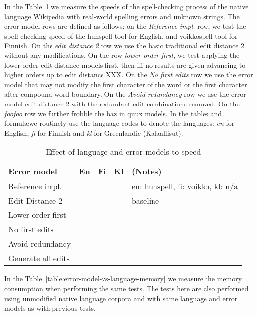 \documentclass[11pt]{article}
\begin{document}
In the Table~\ref{table:error-model-vs-language-speed} we measure the speeds of
the spell-checking process of the native language Wikipedia with real-world
spelling errors and unknown strings. The error model rows are defined as
follows: on the \emph{Reference impl.} row, we test the spell-checking speed of
the hunspell tool for English, and voikkospell tool for Finnish. On the
\emph{edit distance 2} row we use the basic traditional edit distance 2 without
any modifications. On the row \emph{lower order first}, we test applying the
lower order edit distance models first, then iff no results are given advancing
to higher orders up to edit distance XXX. On the \emph{No first edits} row we
use the error model that may not modify the first character of the word or the
first character after compound word boundary. On the \emph{Avoid redundancy}
row we use the error model edit distance 2 with the redundant edit combinations
removed. On the \emph{foofoo} row we further frobble the baz  in quux models.
In the tables and formul\ae we routinely use the language codes to denote the
languages: \emph{en} for English, \emph{fi} for Finnish and \emph{kl} for 
Greenlandic (Kalaallisut). 

\begin{table}[h]
\begin{center}
\begin{scriptsize}
\begin{tabular}{|l|rrrl|}
\hline
\bf Error model & \bf En & \bf Fi & \bf Kl & (Notes) \\ 
\hline
Reference impl.   & & & --- & en: hunspell, fi: voikko, kl: n/a \\
\hline
Edit Distance 2    & & & & baseline \\
Lower order first  & & & & \\
No first edits     & & & & \\
Avoid redundancy   & & & & \\
Generate all edits & & & & \\
\hline
\end{tabular}
\end{scriptsize}
\end{center}
\caption{\label{table:error-model-vs-language-speed} Effect of language and 
error models to speed}
\end{table}

In the Table~\ref{table:error-model-vs-language-memory} we measure the memory
consumption when performing the same tests. The tests here are also performed
using unmodified native language corpora and with same language and error
models as with previous tests.
\end{document}
